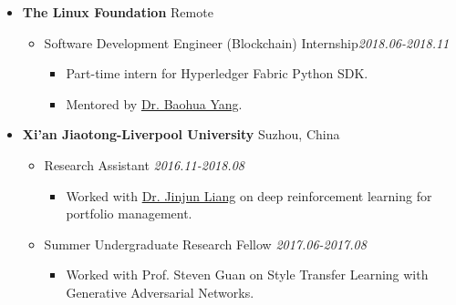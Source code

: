 \documentclass[11pt]{article}
\begin{document}
\begin{itemize}[leftmargin=0em, noitemsep, nolistsep]
        \begin{itemize}[noitemsep, nolistsep, leftmargin=0em]
            \item[] Research Assistant \hfill \textit{2019.03-2019.08}
             \begin{itemize}
                \small
                \item[--] Worked with \href{https://personal.ntu.edu.sg/tanrui/}{Prof. Rui Tan} on collaborative learning, Internet of Things (IoT) and privacy; led the privacy-preserving ML in IoT project.
             \end{itemize}
        \end{itemize}
    \item[] \large\textbf{The Linux Foundation} \hfill Remote
        \begin{itemize}[noitemsep, nolistsep, leftmargin=0em]
            \item[] Software Development Engineer (Blockchain) Internship\hfill \textit{2018.06-2018.11}
             \begin{itemize}
                \small
                \item[--] Part-time intern for Hyperledger Fabric Python SDK.
                \item[--] Mentored by \href{https://yeasy.github.io/}{Dr. Baohua Yang}.
             \end{itemize}
        \end{itemize}
    \item[] \large\textbf{Xi'an Jiaotong-Liverpool University} \hfill Suzhou, China
        \begin{itemize}[noitemsep, nolistsep, leftmargin=0em]
            \item[] Research Assistant \hfill \textit{2016.11-2018.08}
             \begin{itemize}
                \small
                \item[--] Worked with \href{https://www.linkedin.com/in/kumkee}{Dr. Jinjun Liang} on deep reinforcement learning for portfolio management.
             \end{itemize}
            \item[] Summer Undergraduate Research Fellow \hfill \textit{2017.06-2017.08}
             \begin{itemize}
                \small
                \item[--] Worked with Prof. Steven Guan on Style Transfer Learning with Generative Adversarial Networks.
             \end{itemize}

\end{itemize}
\end{itemize}
\end{document}
